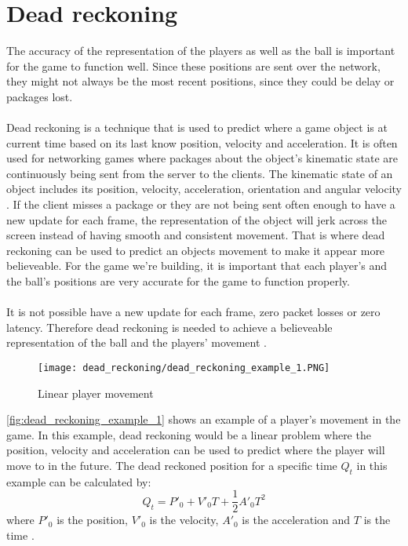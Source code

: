 \section{Dead reckoning}
The accuracy of the representation of the players as well as the ball is important for the game to function well.
Since these positions are sent over the network, they might not always be the most recent positions, since they could be delay or packages lost.
\\\\
Dead reckoning is a technique that is used to predict where a game object is at current time based on its last know position, velocity and acceleration.
It is often used for networking games where packages about the object's kinematic state are continuously being sent from the server to the clients.
The kinematic state of an object includes its position, velocity, acceleration, orientation and angular velocity \autocite{DeadReckoning}.
If the client misses a package or they are not being sent often enough to have a new update for each frame, the representation of the object will jerk across the screen instead of having smooth and consistent movement.
That is where dead reckoning can be used to predict an objects movement to make it appear more believeable.
For the game we're building, it is important that each player's and the ball's positions are very accurate for the game to function properly.
\\\\
It is not possible have a new update for each frame, zero packet losses or zero latency. 
Therefore dead reckoning is needed to achieve a believeable representation of the ball and the players' movement \autocite{DeadReckoning}.
\begin{figure}[H]
    \centering
    \texttt{[image: dead\_reckoning/dead\_reckoning\_example\_1.PNG]}
    \caption{Linear player movement}
    \label{fig:dead_reckoning_example_1}
\end{figure}
\autoref{fig:dead_reckoning_example_1} shows an example of a player's movement in the game.
In this example, dead reckoning would be a linear problem where the position, velocity and acceleration can be used to predict where the player will move to in the future. 
The dead reckoned position for a specific time $Q_t$ in this example can be calculated by:
\begin{displaymath}
    Q_t = P'_0 + V'_0T + \frac{1}{2}A'_0T^2
\end{displaymath}
where $ P'_0 $ is the position, $ V'_0 $ is the velocity, $ A'_0 $ is the acceleration and $T$ is the time \autocite{DeadReckoning}.
